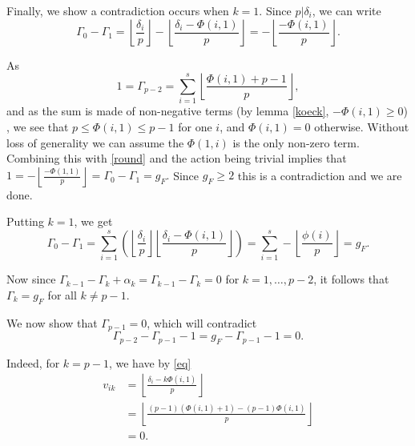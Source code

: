 Finally, we show a contradiction occurs when $k = 1$.
Since $p| \delta_i$, we can write
\begin{equation}\label{round}
 \Gamma_0 - \Gamma_1 = \left\lfloor \frac{\delta_i}{p} \right\rfloor -\left\lfloor \frac{\delta_i - \Phi(i,1)}{p} \right\rfloor = -\left\lfloor \frac{-\Phi(i,1)}{p} \right\rfloor.
\end{equation}

As 
\[
 1 = \Gamma_{p-2} = \sum_{i=1}^s\left\lfloor \frac{\Phi(i,1) + p -1}{p} \right\rfloor,
\]
 and as the sum is made of non-negative terms (by lemma \ref{koeck}, $-\Phi(i,1) \geq 0$) , we see that $p \leq \Phi(i,1) \leq p-1$ for one $i$, and $\Phi(i,1) = 0$ otherwise.
Without loss of generality we can assume the $\Phi(1,i)$ is the only non-zero term.
Combining this with \ref{round} and the action being trivial implies that $1 = -\left\lfloor \frac{-\Phi(1,1)}{p} \right\rfloor = \Gamma_0 - \Gamma_1 = g_F.$
Since $g_F \geq 2$ this is a contradiction and we are done.


\newpage


Putting $k=1$, we get 
\[
\Gamma_0 - \Gamma_1 = \sum_{i=1}^s\left(\left\lfloor \frac{\delta_i}{p} \right\rfloor \left\lfloor \frac{\delta_i - \Phi(i,1)}{p} \right\rfloor \right) = \sum_{i=1}^s - \left\lfloor \frac{\phi(i)}{p} \right\rfloor = g_F.
\]

Now since $\Gamma_{k-1}-\Gamma_k+\alpha_k = \Gamma_{k-1}-\Gamma_k = 0$ for $k=1,\ldots ,p-2$, it follows that $\Gamma_k=g_F$ for all $k\neq p-1$.

We now show that $\Gamma_{p-1} = 0$, which will contradict
\[
 \Gamma_{p-2} - \Gamma_{p-1} - 1 = g_F - \Gamma_{p-1} - 1 = 0.
\]


Indeed, for $k = p-1$, we have by \ref{eq}
\begin{align*}
v_{ik} & =  \left \lfloor \frac{\delta_i - k\Phi(i,1)}{p} \right\rfloor \\
	& =  \left\lfloor \frac{(p-1)(\Phi(i,1) + 1) - (p-1)\Phi(i,1)}{p} \right\rfloor\\
	& =  0.
\end{align*}



